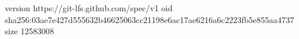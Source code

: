 version https://git-lfs.github.com/spec/v1
oid sha256:03ae7e427d555632b46625063cc21198e6ac17ae6216a6c2223fb5e855aa4737
size 12583008
